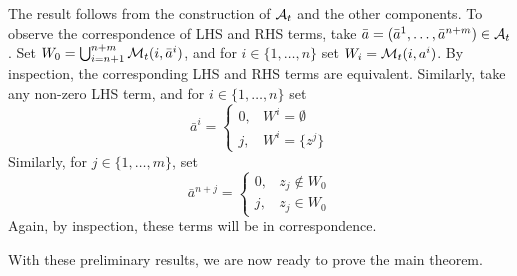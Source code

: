 \documentclass[journal,twoside]{IEEEtran}
\theoremstyle{plain}
\begin{document}
%
\begin{IEEEproof}
The result follows from the construction of ${\cal A}_t$ and the other components. To observe the correspondence of LHS and RHS terms, take $\bar{a}=(\bar{a}^1,\dots,\bar{a}^{n+m})\in{\cal A}_t$. Set $W_0=\bigcup_{i=n+1}^{n+m}{\cal M}_t(i,\bar{a}^i)$, and for $i\in\{1,\dots,n\}$ set $W_i={\cal M}_t(i,a^i)$. By inspection, the corresponding LHS and RHS terms are equivalent. Similarly, take any non-zero LHS term, and for $i\in\{1,\dots,n\}$ set
%
\begin{equation}
\bar{a}^i = \begin{cases}
0, & W^i = \emptyset \\
j, & W^i = \{z^j\} 
\end{cases}
\end{equation}
%
Similarly, for $j\in\{1,\dots,m\}$, set
%
\begin{equation}
\bar{a}^{n+j} = \begin{cases}
0, & z_j\notin W_0 \\
j, & z_j\in W_0
\end{cases}
\end{equation}
%
Again, by inspection, these terms will be in correspondence.
\end{IEEEproof}

With these preliminary results, we are now ready to prove the main theorem.
\end{document}
